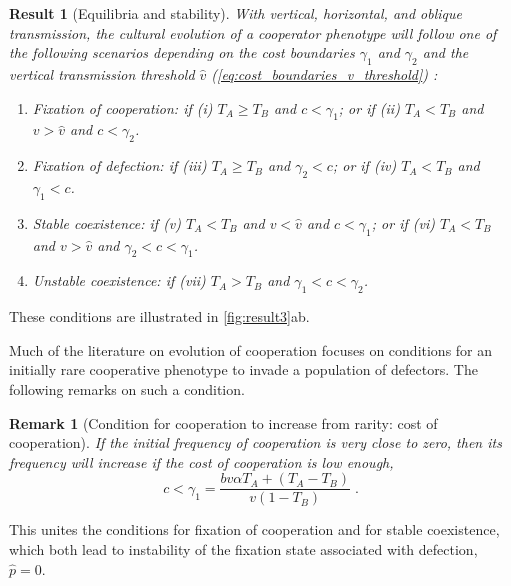\documentclass[12pt]{extarticle}
\newtheorem{remark}{Remark}
\newtheorem{result}{Result}
\begin{document}
\begin{result}[Equilibria and stability] \label{result:vert_obli_hori}
With vertical, horizontal, and oblique transmission, the cultural evolution of a cooperator phenotype will follow one of the following scenarios depending on the cost boundaries $\gamma_1$ and $\gamma_2$ and the vertical transmission threshold $\hat v$ (\autoref{eq:cost_boundaries_v_threshold}) :

\begin{enumerate}
\item \emph{Fixation of cooperation}: 
	if \emph{(i)} $T_A \ge T_B$ and $c < \gamma_1$; or 
	if \emph{(ii)} $T_A < T_B$ and $v>\hat v$ and $c < \gamma_2$.
\item \emph{Fixation of defection}: 
    if \emph{(iii)} $T_A \ge T_B$ and $\gamma_2 < c$; or 
	if \emph{(iv)} $T_A < T_B$ and $\gamma_1 < c$.
\item \emph{Stable coexistence}: 
    if \emph{(v)} $T_A < T_B$ and $v<\hat{v}$ and $c < \gamma_1$; or 
    if \emph{(vi)} $T_A < T_B$ and $v>\hat{v}$ and $\gamma_2 < c < \gamma_1$.
\item \emph{Unstable coexistence}:
    if \emph{(vii)} $T_A > T_B$ and $\gamma_1 < c < \gamma_2$.
\end{enumerate}

\end{result}
These conditions are illustrated in \autoref{fig:result3}ab.

Much of the literature on evolution of cooperation focuses on conditions for  an initially rare cooperative phenotype to invade a population of defectors.
The following remarks on such a condition.
\\

\begin{remark}[Condition for cooperation to increase from rarity: cost of cooperation]
\label{remark:rarity}
If the initial frequency of cooperation is very close to zero, then its frequency will increase if the cost of cooperation is low enough,
\begin{equation} \label{eq:unequal_transmission_from_rarity_general_case}
c < \gamma_1 = \frac{b v \alpha T_A + (T_A - T_B)}{v(1-T_B)} \;.
\end{equation} 
\end{remark}

This unites the conditions for fixation of cooperation and for stable coexistence, which both lead to instability of the fixation state associated with defection, $\hat{p}=0$.
\end{document}
